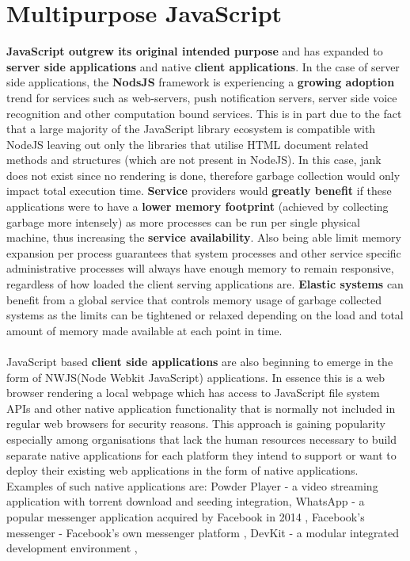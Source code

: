 \documentclass{l4proj}
\begin{document}
\section{Multipurpose JavaScript}
\hspace*{3em} \textbf{JavaScript outgrew its original intended purpose} and has expanded to \textbf{server side applications} and native \textbf{client applications}. In the case of server side applications, the \textbf{NodsJS} framework is experiencing a \textbf{growing adoption} trend for services such as web-servers, push notification servers, server side voice recognition and other computation bound services. This is in part due to the fact that a large majority of the JavaScript library ecosystem is compatible with NodeJS leaving out only the libraries that utilise HTML document related methods and structures (which are not present in NodeJS). In this case, jank does not exist since no rendering is done, therefore garbage collection would only impact total execution time. \textbf{Service} providers would \textbf{greatly benefit} if these applications were to have a \textbf{lower memory footprint} (achieved by collecting garbage more intensely) as more processes can be run per single physical machine, thus increasing the \textbf{service availability}. Also being able limit memory expansion per process guarantees that system processes and other service specific administrative processes will always have enough memory to remain responsive, regardless of how loaded the client serving applications are. \textbf{Elastic systems} can benefit from a global service that controls memory usage of garbage collected systems as the limits can be tightened or relaxed depending on the load and total amount of memory made available at each point in time.
\\\\
\hspace*{3em} JavaScript based \textbf{client side applications} are also beginning to emerge in the form of NWJS(Node Webkit JavaScript) applications. In essence this is a web browser rendering a local webpage which has access to JavaScript file system APIs and other native application functionality that is normally not included in regular web browsers for security reasons. This approach is gaining popularity especially among organisations that lack the human resources necessary to build separate native applications for each platform they intend to support or want to deploy their existing web applications in the form of native applications. 
Examples of such native applications are: Powder Player - a video streaming application with torrent download and seeding integration\cite{powderplayer}, WhatsApp - a popular messenger application acquired by Facebook in 2014 \cite{whatsap}, Facebook’s messenger - Facebook's own messenger platform \cite{messenger}, DevKit - a modular integrated development environment \cite{devkit},
\end{document}
